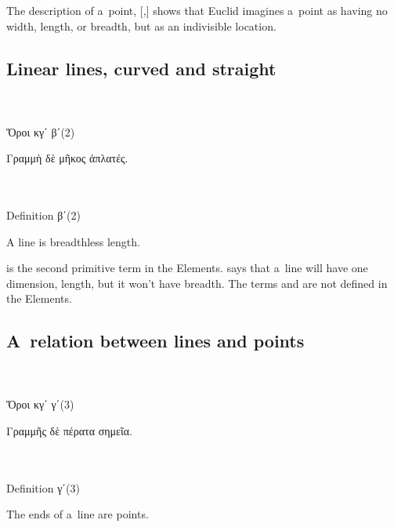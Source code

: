 The description of a~point, [,] shows that Euclid imagines a~point as having no width, length, or breadth, but as an indivisible location.

\subsection{Linear lines, curved and straight}

{\small
\setlength{\parindent}{0pt}

\nopagebreak%
\begin{multicols}{2}
%
\\
\\[.3em]
\textgreek{Ὅροι κγ΄} \textgreek{β΄}\:(2)

\textgreek{Γραμμὴ δὲ μῆκος ἀπλατές.}

\columnbreak
%
\\
\\[.3em]
Definition \textgreek{β΄}\:(2)

A line is breadthless length.
%
\end{multicols}
\par}

 is the second primitive term in the Elements.
 says that a~line will have one dimension, length, but it won’t have breadth.
The terms  and  are not defined in the Elements.

\subsection{A~relation between lines and points}

{\small
\setlength{\parindent}{0pt}

\nopagebreak%
\begin{multicols}{2}
%
\\
\\[.3em]
\textgreek{Ὅροι κγ΄} \textgreek{γ΄}\:(3)

\textgreek{Γραμμῆς δὲ πέρατα σημεῖα.}

\columnbreak
%
\\
\\[.3em]
Definition \textgreek{γ΄}\:(3)

The ends of a~line are points.
%
\end{multicols}
\par}

